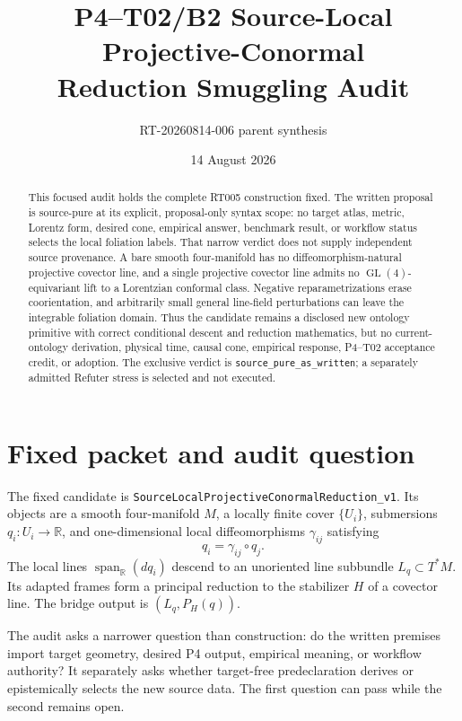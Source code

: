 \documentclass[11pt]{article}
\title{P4--T02/B2 Source-Local Projective-Conormal\\Reduction Smuggling Audit}
\author{RT-20260814-006 parent synthesis}
\date{14 August 2026}
\newcommand{\GL}{\operatorname{GL}}
\newcommand{\Span}{\operatorname{span}_{\mathbb R}}
\begin{document}
\maketitle

\begin{abstract}
This focused audit holds the complete RT005 construction fixed.  The written
proposal is source-pure at its explicit, proposal-only syntax scope: no target
atlas, metric, Lorentz form, desired cone, empirical answer, benchmark result,
or workflow status selects the local foliation labels.  That narrow verdict
does not supply independent source provenance.  A bare smooth four-manifold
has no diffeomorphism-natural projective covector line, and a single
projective covector line admits no $\GL(4)$-equivariant lift to a Lorentzian
conformal class.  Negative reparametrizations erase coorientation, and
arbitrarily small general line-field perturbations can leave the integrable
foliation domain.  Thus the candidate remains a disclosed new ontology
primitive with correct conditional descent and reduction mathematics, but no
current-ontology derivation, physical time, causal cone, empirical response,
P4--T02 acceptance credit, or adoption.  The exclusive verdict is
\texttt{source\_pure\_as\_written}; a separately admitted Refuter stress is
selected and not executed.
\end{abstract}

\section{Fixed packet and audit question}

The fixed candidate is
\texttt{SourceLocalProjectiveConormalReduction\_v1}.  Its objects are a smooth
four-manifold $M$, a locally finite cover $\{U_i\}$, submersions
$q_i:U_i\to\mathbb R$, and one-dimensional local diffeomorphisms
$\gamma_{ij}$ satisfying
\[
 q_i=\gamma_{ij}\circ q_j.
\]
The local lines $\Span(dq_i)$ descend to an unoriented line subbundle
$L_q\subset T^*M$.  Its adapted frames form a principal reduction to the
stabilizer $H$ of a covector line.  The bridge output is
$(L_q,P_H(q))$.

The audit asks a narrower question than construction: do the written
premises import target geometry, desired P4 output, empirical meaning, or
workflow authority?  It separately asks whether target-free predeclaration
derives or epistemically selects the new source data.  The first question can
pass while the second remains open.
\end{document}
